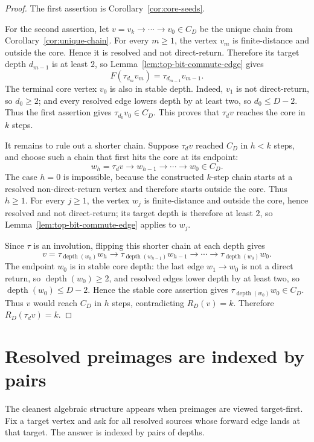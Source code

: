 \documentclass[11pt]{article}
\theoremstyle{definition}
\theoremstyle{remark}
\newcommand{\depth}{\operatorname{depth}}
\begin{document}
\begin{proof}
The first assertion is Corollary~\ref{cor:core-seeds}.

For the second assertion, let $v=v_k\to\cdots\to v_0\in C_D$ be the unique chain from Corollary~\ref{cor:unique-chain}.  For every $m\ge1$, the vertex $v_m$ is finite-distance and outside the core.  Hence it is resolved and not direct-return.  Therefore its target depth $d_{m-1}$ is at least $2$, so Lemma~\ref{lem:top-bit-commute-edge} gives
\[
F(\tau_{d_m}v_m)=\tau_{d_{m-1}}v_{m-1}.
\]
The terminal core vertex $v_0$ is also in stable depth.  Indeed, $v_1$ is not direct-return, so $d_0\ge2$; and every resolved edge lowers depth by at least two, so $d_0\le D-2$.  Thus the first assertion gives $\tau_{d_0}v_0\in C_D$.  This proves that $\tau_dv$ reaches the core in $k$ steps.

It remains to rule out a shorter chain.  Suppose $\tau_dv$ reached $C_D$ in $h<k$ steps, and choose such a chain that first hits the core at its endpoint:
\[
w_h=\tau_dv\to w_{h-1}\to\cdots\to w_0\in C_D.
\]
The case $h=0$ is impossible, because the constructed $k$-step chain starts at a resolved non-direct-return vertex and therefore starts outside the core.  Thus $h\ge1$.  For every $j\ge1$, the vertex $w_j$ is finite-distance and outside the core, hence resolved and not direct-return; its target depth is therefore at least $2$, so Lemma~\ref{lem:top-bit-commute-edge} applies to $w_j$.

Since $\tau$ is an involution, flipping this shorter chain at each depth gives
\[
v=\tau_{\depth(w_h)}w_h\to
\tau_{\depth(w_{h-1})}w_{h-1}\to\cdots\to
\tau_{\depth(w_0)}w_0.
\]
The endpoint $w_0$ is in stable core depth: the last edge $w_1\to w_0$ is not a direct return, so $\depth(w_0)\ge2$, and resolved edges lower depth by at least two, so $\depth(w_0)\le D-2$.  Hence the stable core assertion gives $\tau_{\depth(w_0)}w_0\in C_D$.  Thus $v$ would reach $C_D$ in $h$ steps, contradicting $R_D(v)=k$.  Therefore $R_D(\tau_dv)=k$.
\end{proof}

\section{Resolved preimages are indexed by pairs}\label{sec:preimages}

The cleanest algebraic structure appears when preimages are viewed target-first.  Fix a target vertex and ask for all resolved sources whose forward edge lands at that target.  The answer is indexed by pairs of depths.
\end{document}
